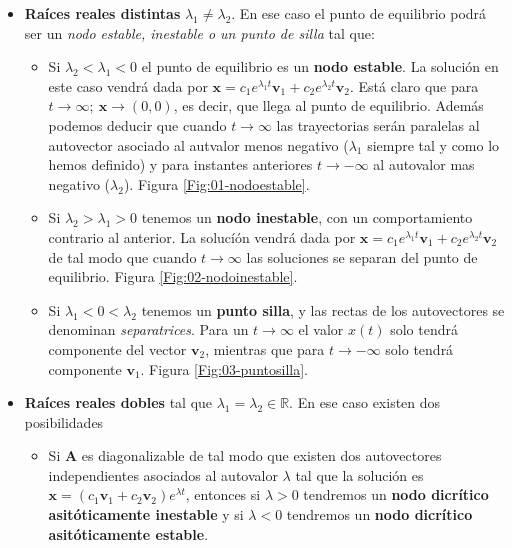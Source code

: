 \documentclass[12pt,a4paper]{article}
\numberwithin{equation}{section}
\numberwithin{figure}{section}
\newcommand{\vn}{\mathbf{v}}
\newcommand{\xn}{\mathbf{x}}
\newcommand{\An}{\mathbf{A}}
\begin{document}
\begin{itemize}
\item \textbf{Raíces reales distintas} $\lambda_1 \neq \lambda_2$. En ese caso el punto de equilibrio podrá ser un \textit{nodo estable, inestable o un punto de silla} tal que:

\begin{itemize}
\item Si $\lambda_2 < \lambda_1 < 0$ el punto de equilibrio es un \textbf{nodo estable}. La solución en este caso vendrá dada por $\xn = c_1 e^{\lambda_1 t} \vn_1 + c_2 e^{\lambda_2 t} \vn_2$. Está claro que para $t \rightarrow \infty; \ \xn \rightarrow (0,0)$, es decir, que llega al punto de equilibrio. Además podemos deducir que cuando $t \rightarrow \infty$ las trayectorias serán paralelas al autovector asociado al autvalor menos negativo ($\lambda_1$ siempre tal y como lo hemos definido) y para instantes anteriores $t \rightarrow - \infty$ al autovalor mas negativo ($\lambda_2$). Figura \ref{Fig:01-nodoestable}.

\item Si $\lambda_2 > \lambda_1 > 0$ tenemos un \textbf{nodo inestable}, con un comportamiento contrario al anterior. La solucíón vendrá dada por $\xn = c_1 e^{\lambda_1 t} \vn_1 + c_2 e^{\lambda_2 t} \vn_2$ de tal modo que cuando $t \rightarrow \infty$ las soluciones se separan del punto de equilibrio. Figura \ref{Fig:02-nodoinestable}.

\item Si $\lambda_1 < 0 < \lambda_2$ tenemos un \textbf{punto silla}, y las rectas de los autovectores se denominan \textit{separatrices}. Para un $t \rightarrow \infty$ el valor $x(t)$ solo tendrá componente del vector $\vn_2$, mientras que para $t \rightarrow - \infty$  solo tendrá componente $\vn_1$. Figura \ref{Fig:03-puntosilla}.




\end{itemize}


\item \textbf{Raíces reales dobles} tal que $\lambda_1 = \lambda_2 \in \mathbb{R}$. En ese caso existen dos posibilidades

\begin{itemize}
\item Si $\An$ es diagonalizable de tal modo que existen dos autovectores independientes asociados al autovalor $\lambda$ tal  que la solución es $\xn = (c_1 \vn_1 + c_2 \vn_2) e^{\lambda t}$, entonces si $\lambda>0$ tendremos un \textbf{nodo dicrítico asitóticamente inestable} y si $\lambda<0$ tendremos un \textbf{nodo dicrítico asitóticamente estable}.


\end{itemize}
\end{itemize}
\end{document}
